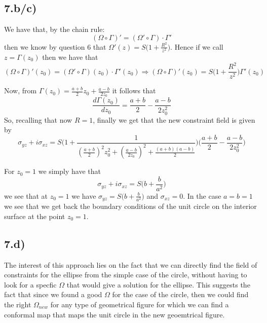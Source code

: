 \documentclass[10pt,a4paper]{book}
\begin{document}
\subsection*{7.b/c)}

We have that, by the chain rule:
$$(\Omega\circ\Gamma)'=(\Omega'\circ\Gamma)\cdot \Gamma'$$then we know by question 6 that $\Omega'(z)=S\big(1+\frac{R^2}{z^2}\big)$. 
Hence if we call $z=\Gamma(z_0)$ then we have that 
$$(\Omega\circ \Gamma)'(z_0)=(\Omega'\circ \Gamma)(z_0)\cdot\Gamma'(z_0)\Rightarrow (\Omega\circ\Gamma)'(z_0)=S\bigg(1+\frac{R^2}{z^2}\bigg)\Gamma'(z_0)$$

%
%
%
Now, from $\Gamma(z_0)=\frac{a+b}{2}z_0+\frac{a-b}{2z_0}$ it follows that 
$$\frac{d\Gamma(z_0)}{d z_0}=\frac{a+b}{2}-\frac{a-b}{2z_0^2}$$
So, recalling that now $R=1$, finally we get that the new constraint field is given by
$$\sigma_{yz}+i\sigma_{xz}=S\bigg(1+\frac{1}{(\frac{a+b}{2})^2z_0^2+(\frac{a-b}{2z_0})^2+\frac{(a+b)(a-b)}{2}}\bigg)\bigg(\frac{a+b}{2}-\frac{a-b}{2z_0^2}\bigg)$$

For $z_0=1$ we simply have that 
$$\sigma_{yz}+i\sigma_{xz}=S\bigg(b+\frac{b}{a^2}\bigg)$$
we see that at $z_0=1$ we have $\sigma_{yz}=S\big(b+\frac{b}{a^2}\big)$ and $\sigma_{xz}=0$. In the case $a=b=1$ we see that we get back the boundary conditions of the unit circle on the interior surface at the point $z_0=1$.
\subsection*{7.d)}

The interest of this approach lies on the fact that we can directly find the field of constraints for the ellipse from the simple case of the circle, without having to look for a specfic $\Omega$ that would give a solution for the ellipse. This suggests the fact that since we found a good $\Omega$ for the case of the circle, then we could find the right $\Omega_{new}$ for any type of geometrical figure for which we can find a conformal map that maps the unit circle in the new geoemtrical figure.
\end{document}
